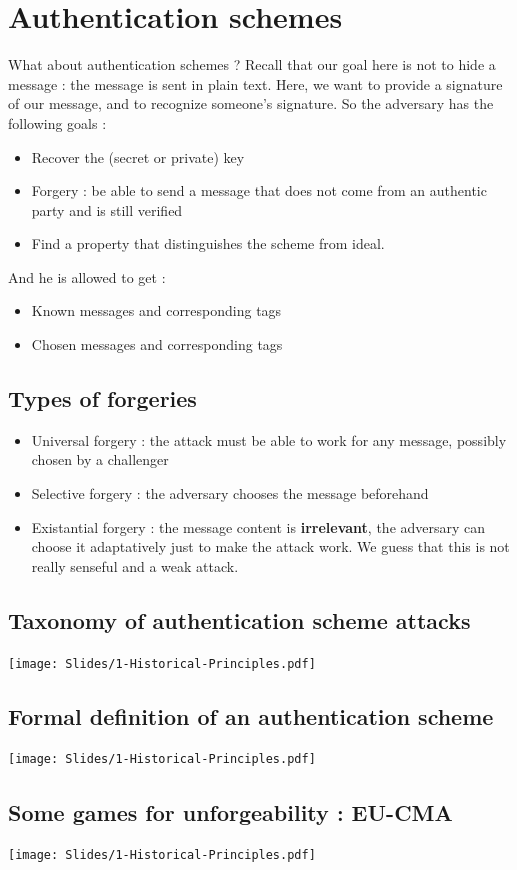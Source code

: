 \documentclass[../Cryptography.tex]{subfiles}
\begin{document}
\section{Authentication schemes}
What about authentication schemes ? Recall that our goal here is not to hide a message : the message is sent in plain text. Here, we want to provide a signature of our message, and to recognize someone's signature. So the adversary has the following goals :
\begin{itemize}
    \item Recover the (secret or private) key
    \item Forgery : be able to send a message that does not come from an authentic party and is still verified
    \item Find a property that distinguishes the scheme from ideal.
\end{itemize}

And he is allowed to get :
\begin{itemize}
    \item Known messages and corresponding tags 
    \item Chosen messages and corresponding tags
\end{itemize}

\subsection{Types of forgeries}
\begin{itemize}
    \item Universal forgery : the attack must be able to work for any message, possibly chosen by a challenger 
    \item Selective forgery : the adversary chooses the message beforehand
    \item Existantial forgery : the message content is \textbf{irrelevant}, the adversary can choose it adaptatively just to make the attack work. We guess that this is not really senseful and a weak attack.
\end{itemize}

\subsection{Taxonomy of authentication scheme attacks}
\begin{center}
    \texttt{[image: Slides/1-Historical-Principles.pdf]}
\end{center}

\subsection{Formal definition of an authentication scheme}
\begin{center}
    \texttt{[image: Slides/1-Historical-Principles.pdf]}
\end{center}

\subsection{Some games for unforgeability : EU-CMA}
\begin{center}
    \texttt{[image: Slides/1-Historical-Principles.pdf]}
\end{center}
\end{document}
